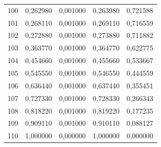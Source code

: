 \begin{small}
\begin{longtable}{rrrrr}
100 & 0,262980 & 0,001000 & 0,263980 & 0,721588 \\
101 & 0,268110 & 0,001000 & 0,269110 & 0,716559 \\
102 & 0,272880 & 0,001000 & 0,273880 & 0,711882 \\
103 & 0,363770 & 0,001000 & 0,364770 & 0,622775 \\
104 & 0,454660 & 0,001000 & 0,455660 & 0,533667 \\
105 & 0,545550 & 0,001000 & 0,546550 & 0,444559 \\
106 & 0,636440 & 0,001000 & 0,637440 & 0,355451 \\
107 & 0,727330 & 0,001000 & 0,728330 & 0,266343 \\
108 & 0,818220 & 0,001000 & 0,819220 & 0,177235 \\
109 & 0,909110 & 0,001000 & 0,910110 & 0,088127 \\
110 & 1,000000 & 0,000000 & 1,000000 & 0,000000 \\
\end{longtable}
\end{small}
